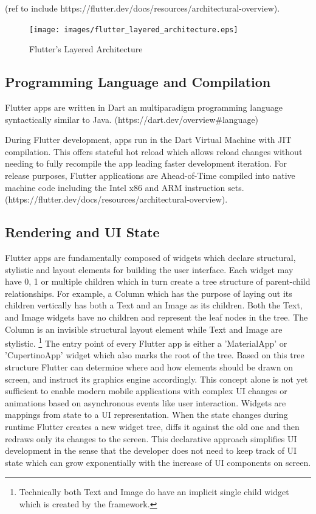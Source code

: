 (ref to include https://flutter.dev/docs/resources/architectural-overview).
\begin{figure}
    \texttt{[image: images/flutter\_layered\_architecture.eps]}
    \caption{Flutter's Layered Architecture}
    \label{fig:flutter_layered_architecture}
\end{figure}


\subsection{Programming Language and Compilation}
Flutter apps are written in Dart an multiparadigm programming language syntactically similar to Java. (https://dart.dev/overview\#language)

During Flutter development, apps run in the Dart Virtual Machine with JIT compilation. This offers stateful hot reload which allows reload changes without needing 
to fully recompile the app leading faster development iteration.
For release purposes, Flutter applications are Ahead-of-Time compiled into native machine code including the Intel x86 and ARM instruction sets.
(https://flutter.dev/docs/resources/architectural-overview).


\subsection{Rendering and UI State}
Flutter apps are fundamentally composed of widgets which declare structural, stylistic and layout elements for building the user interface. 
Each widget may have 0, 1 or multiple children which in turn create a tree structure of parent-child relationships. 
For example, a Column which has the purpose of laying out its children vertically has both a Text and an Image as its children. Both the Text,
and Image widgets have no children and represent the leaf nodes in the tree. The Column is an invisible structural layout element while Text and 
Image are stylistic.
\footnote{Technically both Text and Image do have an implicit single child widget which is created by the framework.}
The entry point of every Flutter app is either a 'MaterialApp' or 'CupertinoApp' widget which also marks the root of the tree.
Based on this tree structure Flutter can determine where and how elements should be drawn on screen, and instruct its graphics engine accordingly.
This concept alone is not yet sufficient to enable modern mobile applications with complex UI changes or animations 
based on asynchronous events like user interaction. 
Widgets are mappings from state to a UI representation. When the state changes during runtime Flutter creates a new widget tree, 
diffs it against the old one and then redraws only its changes to the screen.
This declarative approach simplifies UI development in the sense that the developer does not need to keep track of UI state which can grow exponentially
with the increase of UI components on screen. 

